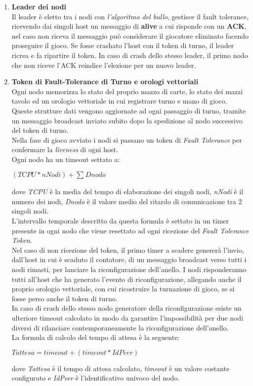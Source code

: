 \documentclass[10pt,a4paper]{article}
\begin{document}
\begin{enumerate}
\item \textbf{Leader dei nodi}\\ Il leader è eletto tra i nodi con \textit{l'algoritmo del bullo}, gestisce il fault tolerance, ricevendo dai singoli host un messaggio di \textbf{alive} a cui risponde con un \textbf{ACK}, nel caso non riceva il messaggio può considerare il giocatore eliminato facendo proseguire il gioco. Se fosse crashato l'host con il token di turno, il leader ricrea e fa ripartire il token. In caso di crash dello stesso leader, il primo nodo che non riceve l'ACK reindice l'elezione per un nuovo leader. 

\item \textbf{Token di Fault-Tolerance di Turno e orologi vettoriali}\\ Ogni nodo memorizza lo stato del proprio mazzo di carte, lo stato dei mazzi tavolo ed un orologio vettoriale in cui registrare turno e mano di gioco. Queste strutture dati vengono aggiornate ad ogni passaggio di turno, tramite un messaggio broadcast inviato subito dopo la spedizione al nodo successivo del token di turno.\\ Nella fase di gioco avviato i nodi si passano un token di \textit{Fault Tolerance} per confermare la \textit{liveness} di ogni host. \\ Ogni nodo ha un timeout settato a: \\\begin{center}$(TCPU*nNodi)+\sum_{}Dnodo$\end{center} dove \textit{TCPU} è la media del tempo di elaborazione dei singoli nodi, \textit{nNodi} è il numero dei nodi, \textit{Dnodo} è il valore medio del ritardo di comunicazione tra 2 singoli nodi.\\L'intervallo temporale descritto da questa formula è settato in un timer presente in ogni nodo che viene resettato ad ogni ricezione del \textit{Fault Tolerance Token}.\\ Nel caso di non ricezione del token, il primo timer a scadere genererà l'invio, dall'host in cui è scaduto il contatore, di un messaggio broadcast verso tutti i nodi rimasti, per lanciare la riconfigurazione dell'anello. I nodi risponderanno tutti all'host che ha generato l'evento di riconfigurazione, allegando anche il proprio orologio vettoriale, con cui ricostruire la turnazione di gioco, se si fosse perso anche il token di turno. \\ In caso di crash dello stesso nodo generatore della riconfigurazione esiste un ulteriore timeout calcolato in modo da garantire l'impossibilità per due nodi diversi di rilanciare contemporaneamente la riconfigurazione dell'anello.\\ La formula di calcolo del tempo di attesa è la seguente:\begin{center}$Tattesa = timeout +(timeout * IdPeer)$\end{center}dove \textit{Tattesa} è il tempo di attesa calcolato, \textit{timeout} è un valore costante configurato e \textit{IdPeer} è l'identificativo univoco del nodo.\end{enumerate}
\end{document}
